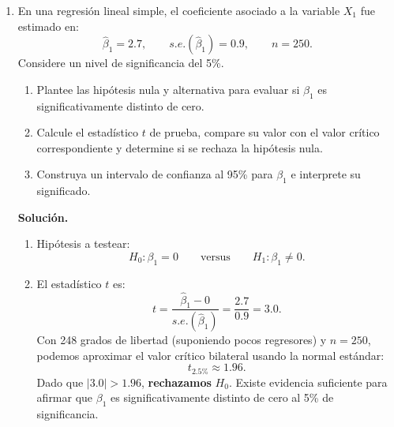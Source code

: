 \documentclass[10pt,a4paper]{article}
\begin{document}
\begin{enumerate}
    \item En una regresión lineal simple, el coeficiente asociado a la variable
        \(X_1\) fue estimado en:
        \[
          \hat\beta_1 = 2.7,
          \qquad s.e.(\hat\beta_1) = 0.9,
          \qquad n = 250.
        \]
        Considere un nivel de significancia del 5\%.

        \begin{enumerate}[label=\alph*)]
          \item Plantee las hipótesis nula y alternativa para evaluar si
                \( \beta_1 \) es significativamente distinto de cero.
          \item Calcule el estadístico \( t \) de prueba, compare su valor
                con el valor crítico correspondiente y determine si se
                rechaza la hipótesis nula.
          \item Construya un intervalo de confianza al 95\% para
                \( \beta_1 \) e interprete su significado.
        \end{enumerate}

        \textbf{Solución.}
        \begin{enumerate}[label=\alph*)]
          \item Hipótesis a testear:
                \[
                  H_0: \beta_1 = 0
                  \qquad\text{versus}\qquad
                  H_1: \beta_1 \neq 0.
                \]
          \item El estadístico \( t \) es:
                \[
                  t
                  = \frac{\hat\beta_1 - 0}{s.e.(\hat\beta_1)}
                  = \frac{2.7}{0.9}
                  = 3.0.
                \]
                Con 248 grados de libertad (suponiendo pocos regresores)
                y \(n = 250\), podemos aproximar el valor crítico bilateral
                usando la normal estándar:
                \[
                  t_{2.5\%} \approx 1.96.
                \]
                Dado que \(|3.0| > 1.96\), \textbf{rechazamos} \( H_0 \).
                Existe evidencia suficiente para afirmar que \( \beta_1 \) es
                significativamente distinto de cero al 5\% de significancia.


\end{enumerate}
\end{enumerate}
\end{document}
